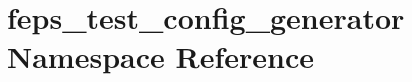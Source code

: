 \hypertarget{namespacefeps__test__config__generator}{}\section{feps\+\_\+test\+\_\+config\+\_\+generator Namespace Reference}
\label{namespacefeps__test__config__generator}
